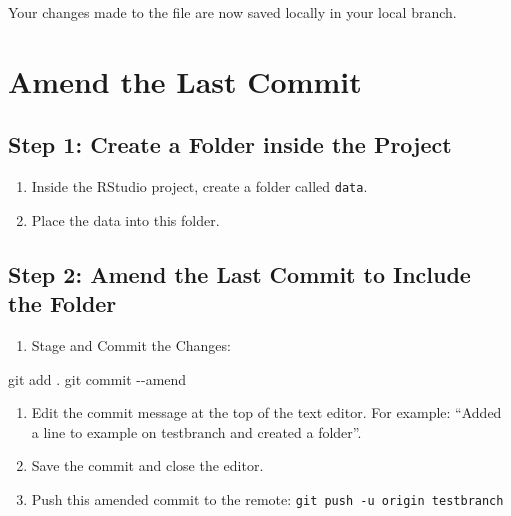 \documentclass[
  11pt,
  letterpaper,
  DIV=11,
  numbers=noendperiod]{scrartcl}
\newenvironment{Shaded}{\begin{snugshade}}{\end{snugshade}}
\newcommand{\AttributeTok}[1]{\textcolor[rgb]{0.40,0.45,0.13}{#1}}
\newcommand{\FunctionTok}[1]{\textcolor[rgb]{0.28,0.35,0.67}{#1}}
\newcommand{\NormalTok}[1]{\textcolor[rgb]{0.00,0.23,0.31}{#1}}
\providecommand{\tightlist}{%
  \setlength{\itemsep}{0pt}\setlength{\parskip}{0pt}}\usepackage{longtable,booktabs,array}
\let\textttOrig\texttt
\renewcommand{\texttt}[1]{\textttOrig{\colorbox{codebggray}{\textcolor{codefontcolor}{#1}}}}
\begin{document}
Your changes made to the file are now saved locally in your local
branch.

\section{Amend the Last Commit}\label{amend-the-last-commit}

\subsection{Step 1: Create a Folder inside the
Project}\label{step-1-create-a-folder-inside-the-project}

\begin{enumerate}
\def\labelenumi{\arabic{enumi}.}
\tightlist
\item
  Inside the RStudio project, create a folder called \texttt{data}.
\item
  Place the data into this folder.
\end{enumerate}

\subsection{Step 2: Amend the Last Commit to Include the
Folder}\label{step-2-amend-the-last-commit-to-include-the-folder}

\begin{enumerate}
\def\labelenumi{\arabic{enumi}.}
\tightlist
\item
  Stage and Commit the Changes:
\end{enumerate}

\begin{Shaded}
\begin{Highlighting}[]
\FunctionTok{git}\NormalTok{ add .}
\FunctionTok{git}\NormalTok{ commit }\AttributeTok{{-}{-}amend}
\end{Highlighting}
\end{Shaded}

\begin{enumerate}
\def\labelenumi{\arabic{enumi}.}
\setcounter{enumi}{1}
\tightlist
\item
  Edit the commit message at the top of the text editor. For example:
  ``Added a line to example on testbranch and created a folder''.
\item
  Save the commit and close the editor.
\item
  Push this amended commit to the remote:
  \texttt{git\ push\ -u\ origin\ testbranch}
\end{enumerate}
\end{document}
